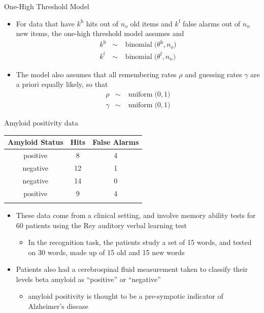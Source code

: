 \documentclass[10pt]{beamer}
\begin{document}
\begin{frame}[fragile]{One-High Threshold Model}
\begin{itemize}
\item For data that have $k^\mathrm{h}$ hits out of $n_o$ old items and  $k^\mathrm{f}$ false alarms out of $n_n$ new items, the one-high threshold model assumes and 
\begin{eqnarray}
k^\mathrm{h} &\sim& \operatorname{binomial}\bigl(\theta^\mathrm{h}, n_o\bigr) \nonumber\\
k^\mathrm{f} &\sim& \operatorname{binomial}\bigl(\theta^\mathrm{f}, n_n\bigr) \nonumber
\end{eqnarray}
\item The model also assumes that all remembering rates $\rho$ and guessing rates $\gamma$ are a priori equally likely, so that
\begin{eqnarray}
\rho &\sim& \operatorname{uniform}\bigl(0, 1\bigr) \nonumber\\
\gamma &\sim&\operatorname{uniform}\bigl(0, 1\bigr) \nonumber
	\end{eqnarray}
\end{itemize}
\vspace{5em}
\end{frame}


\begin{frame}[fragile]{Amyloid positivity data}
	\begin{center}
		\begin{tabular}{ccc}
			\toprule
			Amyloid Status & Hits          & False Alarms  \\
			\hline
			positive       & 8             & 4             \\
			negative       & 12            & 1             \\
			negative       & 14            & 0             \\
			positive       & 9             & 4             \\
			\textellipsis  & \textellipsis & \textellipsis \\
			\bottomrule
		\end{tabular}
	\end{center}
	\begin{itemize}
		\item These data come from a clinical setting, and involve memory ability tests for 60 patients using the Rey auditory verbal learning test \cite{bean2011rey}
		      \begin{itemize}
			      \item In the recognition task, the patients study a set of 15 words, and tested on 30 words, made up of 15 old and 15 new words
		      \end{itemize}
		\item Patients also had a cerebrospinal fluid measurement taken to classify their levels beta amyloid as ``positive'' or ``negative''
		      \begin{itemize}
			      \item amyloid positivity is thought to be a pre-sympotic indicator of Alzheimer's disease
		      \end{itemize}
	\end{itemize}
\end{frame}
\end{document}
